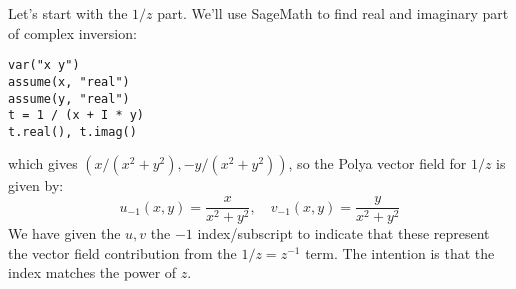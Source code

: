 \documentclass[12pt]{article}
\begin{document}
\medskip
Let's start with the $1/z$ part. We'll use SageMath to find real and imaginary part of complex inversion:
\begin{verbatim}
var("x y")
assume(x, "real")
assume(y, "real")
t = 1 / (x + I * y)
t.real(), t.imag()	
\end{verbatim}
which gives $(x/(x^2 + y^2), -y/(x^2 + y^2))$, so the Polya vector field for $1/z$ is given by:
\begin{equation}
\label{Eq:PolyaFieldLaurentInvTerm}	
\boxed{
u_{-1}(x,y) = \frac{x}{x^2 + y^2}, \quad %
v_{-1}(x,y) = \frac{y}{x^2 + y^2} %
}
\end{equation}
We have given the $u,v$ the $-1$ index/subscript to indicate that these represent the vector field contribution from the $1/z = z^{-1}$ term. The intention is that the index matches the power of $z$.
\end{document}

